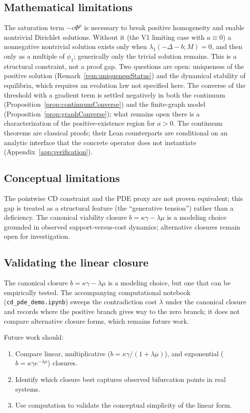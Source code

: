 \documentclass[11pt]{article}
\theoremstyle{plain}
\theoremstyle{definition}
\theoremstyle{remark}
\begin{document}
\subsection*{Mathematical limitations}
The saturation term \(-c\Phi^p\) is necessary to break positive homogeneity and enable nontrivial Dirichlet solutions. Without it (the V1 limiting case with \(a\equiv 0\)) a nonnegative nontrivial solution exists only when \(\lambda_1(-\Delta-b;M)=0\), and then only as a multiple of \(\phi_1\); generically only the trivial solution remains. This is a structural constraint, not a proof gap. Two questions are open: uniqueness of the positive solution (Remark~\ref{rem:uniquenessStatus}) and the dynamical stability of equilibria, which requires an evolution law not specified here. The converse of the threshold with a gradient term is settled negatively in both the continuum (Proposition~\ref{prop:continuumConverse}) and the finite-graph model (Proposition~\ref{prop:graphConverse}); what remains open there is a characterization of the positive-existence region for \(a>0\). The continuum theorems are classical proofs; their Lean counterparts are conditional on an analytic interface that the concrete operator does not instantiate (Appendix~\ref{app:verification}).

\subsection*{Conceptual limitations}
The pointwise CD constraint and the PDE proxy are not proven equivalent; this gap is treated as a structural feature (the ``generative tension'') rather than a deficiency. The canonical viability closure \(b = \kappa\gamma - \lambda\mu\) is a modeling choice grounded in observed support-versus-cost dynamics; alternative closures remain open for investigation.

\subsection*{Validating the linear closure}
The canonical closure \(b = \kappa\gamma - \lambda\mu\) is a modeling choice, but one that can be empirically tested. The accompanying computational notebook (\texttt{cd\_pde\_demo.ipynb}) sweeps the contradiction cost \(\lambda\) under the canonical closure and records where the positive branch gives way to the zero branch; it does not compare alternative closure forms, which remains future work.

Future work should:
\begin{enumerate}
\item Compare linear, multiplicative (\(b = \kappa\gamma/(1 + \lambda\mu)\)), and exponential (\(b = \kappa\gamma e^{-\lambda\mu}\)) closures.
\item Identify which closure best captures observed bifurcation points in real systems.
\item Use computation to validate the conceptual simplicity of the linear form.
\end{enumerate}
\end{document}
